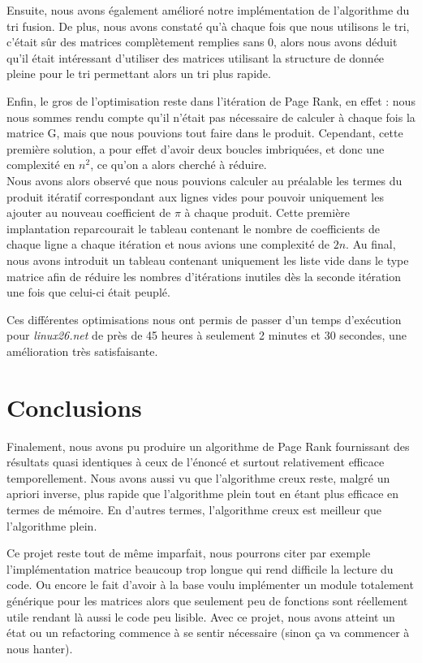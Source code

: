 \documentclass{NewTeX}
\begin{document}
Ensuite, nous avons également amélioré notre implémentation de l'algorithme du tri fusion. De plus, nous avons constaté qu'à chaque fois que nous utilisons le tri, c'était sûr des matrices complètement remplies sans 0, alors nous avons déduit qu'il était intéressant d'utiliser des matrices utilisant la structure de donnée pleine pour le tri permettant alors un tri plus rapide.

Enfin, le gros de l'optimisation reste dans l'itération de Page Rank, en effet :  nous nous sommes rendu compte qu'il n'était pas nécessaire de calculer à chaque fois la matrice G, mais que nous pouvions tout faire dans le produit. Cependant, cette première solution, a pour effet d'avoir deux boucles imbriquées, et donc une complexité en $n^2$, ce qu'on a alors cherché à réduire.  \\ Nous avons alors observé que nous pouvions calculer au préalable les termes du produit itératif correspondant aux lignes vides pour pouvoir uniquement les ajouter au nouveau coefficient de $\pi$ à chaque produit. Cette première implantation reparcourait le tableau contenant le nombre de coefficients de chaque ligne a chaque itération et nous avions une complexité de $2n$.  Au final, nous avons introduit un tableau contenant uniquement les liste vide dans le type matrice afin de réduire les nombres d'itérations inutiles dès la seconde itération une fois que celui-ci était peuplé.

Ces différentes optimisations nous ont permis de passer d'un temps d'exécution pour \textit{linux26.net} de près de 45 heures à seulement 2 minutes et 30 secondes, une amélioration très satisfaisante.  

\section{Conclusions}

Finalement, nous avons pu produire un algorithme de Page Rank fournissant des résultats quasi identiques à ceux de l'énoncé et surtout relativement efficace temporellement. Nous avons aussi vu que l'algorithme creux reste, malgré un apriori inverse, plus rapide que l'algorithme plein tout en étant plus efficace en termes de mémoire. En d'autres termes, l'algorithme creux est meilleur que l'algorithme plein.

Ce projet reste tout de même imparfait, nous pourrons citer par exemple l'implémentation matrice beaucoup trop longue qui rend difficile la lecture du code. Ou encore le fait d'avoir à la base voulu implémenter un module totalement générique pour les matrices alors que seulement peu de fonctions sont réellement utile rendant là aussi le code peu lisible. Avec ce projet, nous avons atteint un état ou un refactoring commence à se sentir nécessaire (sinon ça va commencer à nous hanter).
\end{document}
